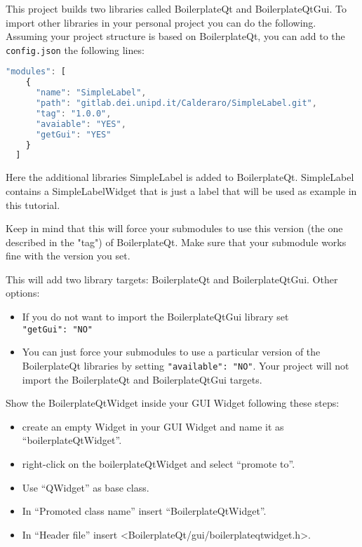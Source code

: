 
This project builds two libraries called BoilerplateQt and
BoilerplateQtGui. To import other libraries in your personal project you
can do the following. Assuming your project structure is based on
BoilerplateQt, you can add to the \texttt{config.json} the following
lines:

\begin{lstlisting}[language=javascript, gobble=2]
  "modules": [
    {
      "name": "SimpleLabel",
      "path": "gitlab.dei.unipd.it/Calderaro/SimpleLabel.git",
      "tag": "1.0.0",
      "avaiable": "YES",
      "getGui": "YES"
    }
  ]
\end{lstlisting}

Here the additional libraries SimpleLabel is added to BoilerplateQt. SimpleLabel contains a SimpleLabelWidget that is just a label that will be used as example in this tutorial.

Keep in mind that this will force your submodules to use this version (the one described in the "tag") of BoilerplateQt. Make sure that your submodule works fine with the version you set.

This will add two library targets: BoilerplateQt and BoilerplateQtGui.
Other options:

\begin{itemize}
  \tightlist
  \item
        If you do not want to import the BoilerplateQtGui library set
        \texttt{"getGui":\ "NO"}
  \item
        You can just force your submodules to use a particular version of the
        BoilerplateQt libraries by setting \texttt{"available":\ "NO"}. Your
        project will not import the BoilerplateQt and BoilerplateQtGui
        targets.
\end{itemize}


Show the BoilerplateQtWidget inside your GUI Widget following these
steps:

\begin{itemize}
  \tightlist
  \item
        create an empty Widget in your GUI Widget and name it as
        ``boilerplateQtWidget''.
  \item
        right-click on the boilerplateQtWidget and select ``promote to''.
  \item
        Use ``QWidget'' as base class.
  \item
        In ``Promoted class name'' insert ``BoilerplateQtWidget''.
  \item
        In ``Header file'' insert
        \textless BoilerplateQt/gui/boilerplateqtwidget.h\textgreater.
\end{itemize}

